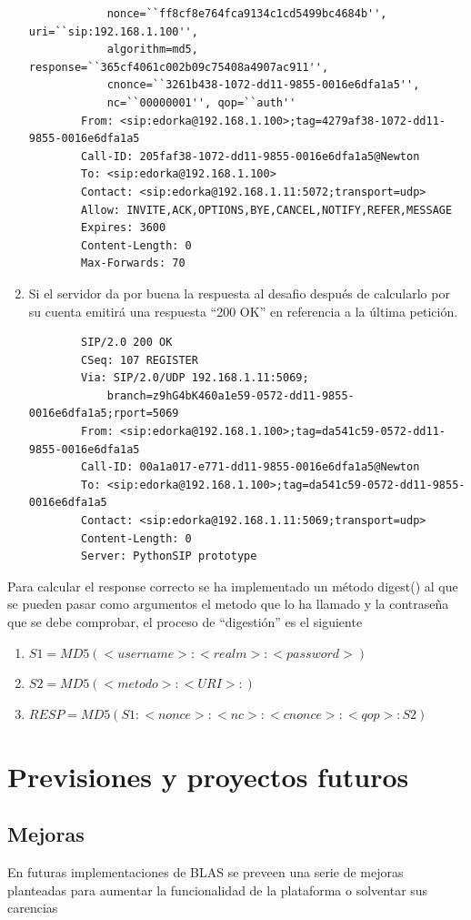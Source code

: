 \documentclass[a4paper,spanish,12pt]{book}
\begin{document}
\begin{enumerate}
\begin{verbatim}
			nonce=``ff8cf8e764fca9134c1cd5499bc4684b'', uri=``sip:192.168.1.100'', 
			algorithm=md5, response=``365cf4061c002b09c75408a4907ac911'', 
			cnonce=``3261b438-1072-dd11-9855-0016e6dfa1a5'', 
			nc=``00000001'', qop=``auth''
		From: <sip:edorka@192.168.1.100>;tag=4279af38-1072-dd11-9855-0016e6dfa1a5
		Call-ID: 205faf38-1072-dd11-9855-0016e6dfa1a5@Newton
		To: <sip:edorka@192.168.1.100>
		Contact: <sip:edorka@192.168.1.11:5072;transport=udp>
		Allow: INVITE,ACK,OPTIONS,BYE,CANCEL,NOTIFY,REFER,MESSAGE
		Expires: 3600
		Content-Length: 0
		Max-Forwards: 70
		\end{verbatim}
		\normalsize
	\item Si el servidor da por buena la respuesta al desafio despu\'es de calcularlo por su cuenta emitirá una respuesta ``200 OK'' en referencia a la última petición.
		\scriptsize
		\begin{verbatim}
		SIP/2.0 200 OK
		CSeq: 107 REGISTER
		Via: SIP/2.0/UDP 192.168.1.11:5069;
			branch=z9hG4bK460a1e59-0572-dd11-9855-0016e6dfa1a5;rport=5069
		From: <sip:edorka@192.168.1.100>;tag=da541c59-0572-dd11-9855-0016e6dfa1a5
		Call-ID: 00a1a017-e771-dd11-9855-0016e6dfa1a5@Newton
		To: <sip:edorka@192.168.1.100>;tag=da541c59-0572-dd11-9855-0016e6dfa1a5
		Contact: <sip:edorka@192.168.1.11:5069;transport=udp>
		Content-Length: 0
		Server: PythonSIP prototype
		\end{verbatim}
		\normalsize
\end{enumerate}
Para calcular el response correcto se ha implementado un m\'etodo digest() al que se pueden pasar como argumentos el metodo que lo ha llamado y la contraseña que se debe comprobar, el proceso de ``digestión'' es el siguiente
\begin{enumerate}
	\item \begin{math} S1 = MD5(<username>:<realm>:<password>) \end{math}
	\item \begin{math} S2 = MD5(<metodo>:<URI>:) \end{math}
	\item \begin{math} RESP = MD5(S1:<nonce>:<nc>:<cnonce>:<qop>:S2) \end{math}
\end{enumerate}
\chapter{Previsiones y proyectos futuros}
\section{Mejoras}
En futuras implementaciones de BLAS se preveen una serie de mejoras planteadas para aumentar la funcionalidad de la plataforma o solventar sus carencias
\end{document}
